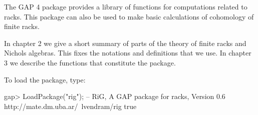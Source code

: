 

The GAP 4 package {\RiG} provides a library of functions for computations
related to racks. This package can also be used to make basic calculations 
of cohomology of finite racks.
 
In chapter 2 we give a short summary of parts of the theory of finite racks
and Nichols algebras. This fixes the notations and definitions that we use. 
In chapter 3 we describe the functions that constitute the package.

To load the package, type: 

\beginexample
gap> LoadPackage("rig");
--
RiG, A GAP package for racks, Version 0.6
http://mate.dm.uba.ar/~lvendram/rig
true
\endexample


